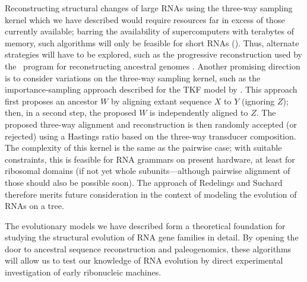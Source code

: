 \documentclass[10pt]{article}
\begin{document}

Reconstructing structural changes of large RNAs
using the three-way sampling kernel which we have described
would require resources far in excess of those currently available;
barring the availability of supercomputers with terabytes of memory,
such algorithms will only be feasible for short RNAs ().
Thus, alternate strategies will have to be explored, such as the
progressive reconstruction used by the \ortheus\ program for
reconstructing ancestral genomes \cite{PatenEtAl2008}.
Another promising direction is to consider variations on the three-way sampling kernel,
such as the importance-sampling approach described for the TKF model
by \cite{RedelingsSuchard2005}.
This approach first proposes an ancestor $W$ by aligning extant
sequence $X$ to $Y$ (ignoring $Z$); then, in a second step, the proposed $W$ is
independently aligned to $Z$. The proposed three-way alignment and
reconstruction is then randomly accepted (or rejected) using a
Hastings ratio based on the three-way transducer composition. The
complexity of this kernel is the same as the pairwise case;
with suitable constraints, this is feasible for RNA
grammars on present hardware, at least for ribosomal domains (if not
yet whole subunits---although pairwise alignment of those should also
be possible soon). The approach of Redelings and Suchard therefore
merits future consideration in the context of modeling the evolution
of RNAs on a tree.

The evolutionary models we have described form a theoretical
foundation for studying the structural evolution of RNA gene families
in detail. By opening the door to ancestral sequence reconstruction
and paleogenomics, these algorithms will allow us to test our
knowledge of RNA evolution by direct experimental investigation
of early ribonucleic machines.











\newpage
\end{document}
